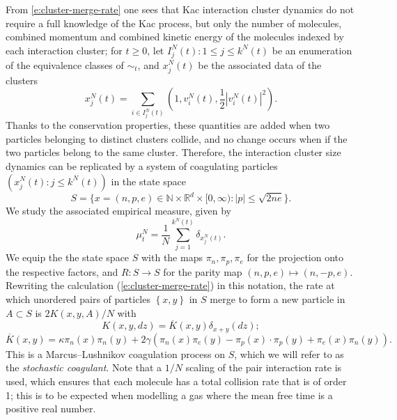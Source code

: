From \eqref{e:cluster-merge-rate} one sees that Kac interaction cluster dynamics do not require a full knowledge of the Kac process, but only the number of molecules, combined momentum and combined kinetic energy of the molecules indexed by each interaction cluster; for $t\ge 0$, let $I^N_j(t): 1\le j \le k^N(t)$ be an enumeration of the equivalence classes of $\sim_t$, and $x^N_j(t)$ be the associated data of the clusters \begin{equation}
    x^N_j(t)=\sum_{i \in I^N_j(t)}\left(1,v^N_i(t),\frac{1}{2}\left|v^N_i(t)\right|^2\right).
\end{equation} 
Thanks to the conservation properties, these quantities are added when two particles belonging to distinct clusters collide, and no change occurs when if the two particles belong to the same cluster. Therefore, the interaction cluster size dynamics can be replicated by a system of coagulating particles $(x^N_j(t): j\le k^N(t))$ in the state space
\begin{equation}
    S=\{x=(n, p, e) \in \mathbb{N}\times \mathbb{R}^d\times [0,\infty): |p|\leq \sqrt{2ne} \}. 
\end{equation} We study the associated empirical measure, given by \begin{equation}\label{eq: sc1}\mu^N_t = \frac{1}{N}\sum_{j=1}^{k^N(t)} \delta_{x^N_j(t)}. \end{equation} We equip the the state space $S$ with the maps $\pi_n, \pi_p, \pi_e$ for the projection onto the respective factors, and $R:S\rightarrow S$ for the parity map $(n,p,e)\mapsto (n,-p,e)$. Rewriting the calculation (\ref{e:cluster-merge-rate}) in this notation, the rate at which unordered pairs of particles $\left\{ x,y \right\}$ in $S$ merge to form a new particle in $A \subset S$ is $2K(x,y, A)/N$ with
\begin{equation}\label{eq: smoluchowski kernel}
    K(x,y,dz)=\overline{K}(x,y)\delta_{x+y}(dz);
    \end{equation} \begin{equation} \label{eq: overline K}  \overline{K}(x,y)=\kappa \pi_n(x)\pi_n(y)+2\gamma\left(\pi_n(x)\pi_e(y)-\pi_p(x)\cdot \pi_p(y)+\pi_e(x)\pi_n(y)\right).
\end{equation} 
This is a Marcus--Lushnikov coagulation process \cite{L78} on $S$, which we will refer to as the \emph{stochastic coagulant}.
Note that a $1/N$ scaling of the pair interaction rate is used, which ensures that each molecule has a total collision rate that is of order 1; this is to be expected when modelling a gas where the mean free time is a positive real number.
